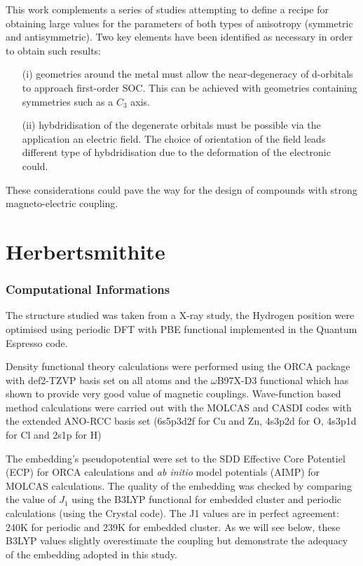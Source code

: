 \documentclass[12pt]{report}
\numberwithin{equation}{section}
\begin{document}
\par This work complements a series of studies attempting to define a recipe for obtaining large values for the parameters of both types of anisotropy (symmetric and antisymmetric).
Two key elements have been identified as necessary in order to obtain such results:
\begin{itemize}
    \item[(i)] geometries around the metal must allow the near-degeneracy of d-orbitals to approach first-order SOC. This can be achieved with geometries containing symmetries such as a $C_3$ axis.
    \item[(ii)] hybdridisation of the degenerate orbitals must be possible via the application an electric field. The choice of orientation of the field leads different type of hybdridisation due to the deformation of the electronic could. 
\end{itemize}
These considerations could pave the way for the design of compounds with strong magneto-electric coupling.


\chapter{Herbertsmithite}


\subsection*{Computational Informations}

The structure studied was taken from a X-ray study, the Hydrogen position were optimised using periodic DFT with PBE functional implemented in the Quantum Espresso code.

Density functional theory calculations were performed using the ORCA package with def2-TZVP basis set on all atoms and the $\omega$B97X-D3 functional which has shown to provide very good value of magnetic couplings.
Wave-function based method calculations were carried out with the MOLCAS and CASDI codes with the extended ANO-RCC basis set (6s5p3d2f for Cu and Zn, 4s3p2d
for O, 4s3p1d for Cl and 2s1p for H)

The embedding's pseudopotential were set to the SDD Effective Core Potentiel (ECP) for ORCA calculations and \textit{ab initio} model potentials (AIMP) for MOLCAS calculations. 
The quality of the embedding was checked by comparing the value of $J_1$ using the B3LYP functional for embedded cluster and periodic calculations (using the Crystal code). 
The J1 values are in perfect agreement: 240K for periodic and 239K for embedded cluster. 
As we will see below, these B3LYP values slightly overestimate the coupling but demonstrate the adequacy of the embedding adopted in this study.
\end{document}
